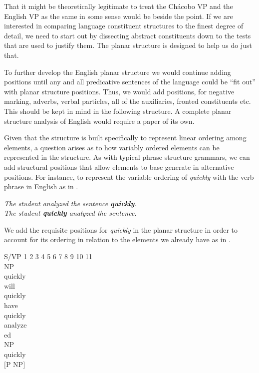 \documentclass[output=paper,hidelinks]{langscibook}
\begin{document}
That it might be theoretically legitimate to treat the Chácobo VP and the English VP as the same in some sense would be beside the point. If we are interested in comparing language constituent structures to the finest degree of detail, we need to start out by dissecting abstract constituents down to the tests that are used to justify them. The planar structure is designed to help us do just that.

To further develop the English planar structure we would continue adding positions until any and all predicative sentences of the language could be ``fit out'' with planar structure positions. Thus, we would add positions, for negative marking, adverbs, verbal particles, all of the auxiliaries, fronted constituents etc. This should be kept in mind in the following structure. A complete planar structure analysis of English would require a paper of its own.

Given that the structure is built specifically to represent linear ordering among elements, a question arises as to how variably ordered elements can be represented in the structure. As with typical phrase structure grammars, we can add structural positions that allow elements to base generate in alternative positions. For instance, to represent the variable ordering of \textit{quickly} with the verb phrase in English as in .

\ea \label{engquickly}
    \ea \textit{The student analyzed the sentence \textbf{quickly}.} \\
    \ex \textit{The student \textbf{quickly} analyzed the sentence.}
    \z
\z

We add the requisite positions for \textit{quickly} in the planar structure in order to account for its ordering in relation to the elements we already have as in .

\ea \label{engplanarstructurerules2}
    \ea S/VP \rightarrow {} 1 2 3 4 5 6 7 8 9 10 11 \\
     \rightarrow {} NP \\
     \rightarrow {} quickly \\
     \rightarrow {} will \\
     \rightarrow {} quickly \\
     \rightarrow {} have \\
     \rightarrow {} quickly \\
     \rightarrow {} analyze \\
     \rightarrow {} ed \\
     \rightarrow {} NP \\
     \rightarrow {} quickly \\
     \rightarrow {} $[$P NP$]$
    \z
\z
\end{document}
